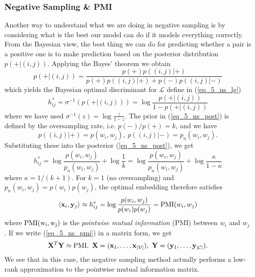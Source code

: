 \documentclass[../book-template.tex]{subfiles}
\begin{document}
\subsubsection{Negative Sampling \& PMI}
Another way to understand what we are doing in negative sampling is by considering what is the best our model can do if it models everything correctly. From the Bayesian view, the best thing we can do for predicting whether a pair is a positive one is to make prediction based on the posterior distribution $p(+|(i,j))$. Applying the Bayes' theorem we obtain
\begin{equation}\label{eq_5_ns_post}
	p(+|(i,j)) = \frac{p(+)p((i,j)|+)}{p(+)p((i,j)|+)+p(-)p((i,j)|-)}
\end{equation}
which yields the Bayesian optimal discriminant for $\mathcal{L}$ define in (\ref{eq_5_ns_lg})
\begin{equation*}
	h^*_{ij}=\sigma^{-1}(p(+|(i,j))) = \log \frac{p(+|(i,j))}{1-p(+|(i,j))}
\end{equation*}
where we have used $\sigma^{-1}(z)=\log \frac{z}{1-z}$. The prior in (\ref{eq_5_ns_post}) is defined by the oversampling rate, i.e. $p(-)/p(+)=k$, and we have
\begin{equation*}
	p((i,j)|+)=p(w_i,w_j),\ p((i,j)|-)=p_n(w_i,w_j).
\end{equation*}
Substituting these into the posterior (\ref{eq_5_ns_post}), we get
\begin{equation*}
	h^*_{ij}=\log\frac{p(w_i,w_j)}{p_n(w_i,w_j)}+\log \frac{1}{k} = \log\frac{p(w_i,w_j)}{p_n(w_i,w_j)}+\log \frac{\kappa}{1-\kappa}
\end{equation*}
where $\kappa=1/(k+1)$. For $k=1$ (no oversampling) and $p_n(w_i,w_j)=p(w_i)p(w_j)$, the optimal embedding therefore satisfies
\begin{equation}\label{eq_5_ns_pmi}
\langle {\bf x}_i,{\bf y}_j \rangle \approx h^*_{ij} = \log\frac{p(w_i,w_j)}{p(w_i)p(w_j)} = {\rm PMI}(w_i,w_j)
\end{equation}
where ${\rm PMI(w_i, w_j)}$ is the \emph{pointwise mutual information} (PMI) between $w_i$ and $w_j$. If we write (\ref{eq_5_ns_pmi}) in a matrix form, we get
\begin{equation*}
	{\bf X}^T{\bf Y}\approx{\rm PMI},\ {\bf X}=({\bf x}_1,\dots,{\bf x}_{|\mathcal{V}|}),\ {\bf Y}=({\bf y}_1,\dots,{\bf y}_{|\mathcal{C}|}).
\end{equation*}
We see that in this case, the negative sampling method actually performs a low-rank approximation to the pointwise mutual information matrix.
\end{document}

